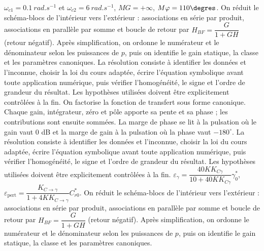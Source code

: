 \begin{corrigebox}[Corrigé]
$\omega_{c1} = \SI{0,1}{rad.s^{-1}}$ et $\omega_{c2} = \SI{6}{rad.s^{-1}}$, $MG=+\infty$, $M\varphi = 110\degres$.
On réduit le schéma-blocs de l'intérieur vers l'extérieur : associations en série par produit, associations en parallèle par somme et boucle de retour par $H_{BF}=\dfrac{G}{1+GH}$ (retour négatif). Après simplification, on ordonne le numérateur et le dénominateur selon les puissances de $p$, puis on identifie le gain statique, la classe et les paramètres canoniques.
La résolution consiste à identifier les données et l'inconnue, choisir la loi du cours adaptée, écrire l'équation symbolique avant toute application numérique, puis vérifier l'homogénéité, le signe et l'ordre de grandeur du résultat. Les hypothèses utilisées doivent être explicitement contrôlées à la fin.
On factorise la fonction de transfert sous forme canonique. Chaque gain, intégrateur, zéro et pôle apporte sa pente et sa phase ; les contributions sont ensuite sommées. La marge de phase se lit à la pulsation où le gain vaut $0$ dB et la marge de gain à la pulsation où la phase vaut $-180^\circ$.
La résolution consiste à identifier les données et l'inconnue, choisir la loi du cours adaptée, écrire l'équation symbolique avant toute application numérique, puis vérifier l'homogénéité, le signe et l'ordre de grandeur du résultat. Les hypothèses utilisées doivent être explicitement contrôlées à la fin.
$\varepsilon_{\gamma} = \dfrac{40 K K_{C \gamma}}{10+40 K K_{C \gamma}}\gamma_{0}^*$, 
$\varepsilon_{\text{pert}} = \dfrac{ K_{C \rightarrow \gamma}}{1+4K K_{C \rightarrow \gamma}}C_{r0}^*$.
On réduit le schéma-blocs de l'intérieur vers l'extérieur : associations en série par produit, associations en parallèle par somme et boucle de retour par $H_{BF}=\dfrac{G}{1+GH}$ (retour négatif). Après simplification, on ordonne le numérateur et le dénominateur selon les puissances de $p$, puis on identifie le gain statique, la classe et les paramètres canoniques.
\end{corrigebox}
